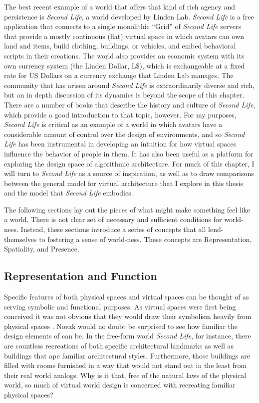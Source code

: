 The best recent example of a world that offers that kind of rich agency and persistence is \emph{Second Life}, a world developed by Linden Lab. \emph{Second Life} is a free application that connects to a single monolithic ``Grid'' of \emph{Second Life} servers that provide a mostly continuous (flat) virtual space in which avatars can own land and items, build clothing, buildings, or vehicles, and embed behavioral scripts in their creations. The world also provides an economic system with its own currency system (the Linden Dollar, L\$), which is exchangeable at a fixed rate for US Dollars on a currency exchange that Linden Lab manages. The community that has arisen around \emph{Second Life} is extraordinarily diverse and rich, but an in depth discussion of its dynamics is beyond the scope of this chapter. There are a number of books that describe the history and culture of \emph{Second Life}, which provide a good introduction to that topic, however. \citep{Au:2008va, Ludlow:2007uu} For my purposes, \emph{Second Life} is critical as an example of a world in which avatars have a considerable amount of control over the design of environments, and so \emph{Second Life} has been instrumental in developing an intuition for how virtual spaces influence the behavior of people in them. It has also been useful as a platform for exploring the design space of algorithmic architecture. For much of this chapter, I will turn to \emph{Second Life} as a source of inspiration, as well as to draw comparisons between the general model for virtual architecture that I explore in this thesis and the model that \emph{Second Life} embodies.

The following sections lay out the pieces of what might make something feel like a world. There is not clear set of necessary and sufficient conditions for world-ness. Instead, these sections introduce a series of concepts that all lend-themselves to fostering a sense of world-ness. These concepts are Representation, Spatiality, and Presence. 

\subsection{Representation and Function}
Specific features of both physical spaces and virtual spaces can be thought of as serving symbolic and functional purposes. As virtual spaces were first being conceived it was not obvious that they would draw their symbolism heavily from physical spaces \citep{Novak:1991ue}. Novak would no doubt be surprised to see how familiar the design elements of can be. In the free-form world \emph{Second Life}, for instance, there are countless recreations of both specific architectural landmarks as well as buildings that ape familiar architectural styles. Furthermore, those buildings are filled with rooms furnished in a way that would not stand out in the least from their real world analogs. Why is it that, free of the natural laws of the physical world, so much of virtual world design is concerned with recreating familiar physical spaces?

